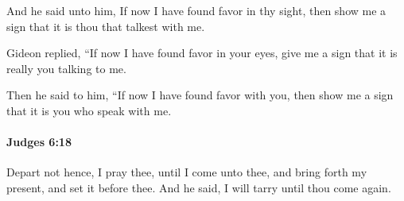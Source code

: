 			\begin{versebox}
					\item[BHS] 
					\item[ASV] And he said unto him, If now I have found favor in thy sight, then show me a sign that it is thou that talkest with me.
					\item[NIV] Gideon replied, “If now I have found favor in your eyes, give me a sign that it is really you talking to me.
					\item[NRSV] Then he said to him, “If now I have found favor with you, then show me a sign that it is you who speak with me.
			\end{versebox}

		\paragraph{Judges 6:18} %
			\label{JUDGES-6-18}

			Depart not hence, I pray thee, until I come unto thee, and bring forth my present, and set it before thee. And he said, I will tarry until thou come again.


